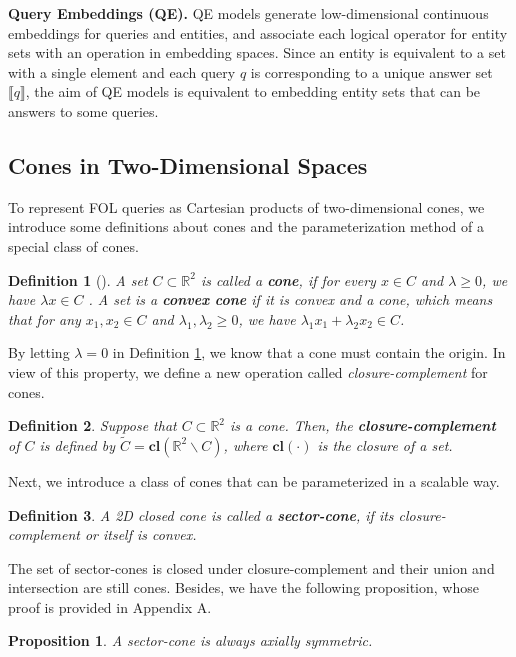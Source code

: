\documentclass{article}
\newcommand{\cl}{\textbf{cl}}
\newtheorem{prop}{Proposition}
\newtheorem{definition}{Definition}
\begin{document}
\textbf{Query Embeddings (QE). } QE models generate low-dimensional continuous embeddings for queries and entities, and associate each logical operator for entity sets with an operation in embedding spaces. 
Since an entity is equivalent to a set with a single element and each query $q$ is corresponding to a unique answer set $\llbracket q\rrbracket$, the aim of QE models is equivalent to embedding entity sets that can be answers to some queries.

\subsection{Cones in Two-Dimensional Spaces}\label{sec:cones}
To represent FOL queries as Cartesian products of two-dimensional cones, we introduce some definitions about cones and the parameterization method of a special class of cones.
\begin{definition}[\citet{boyd}]\label{def:cone}
A set $C\subset\mathbb{R}^2$ is called a \textbf{cone}, if for every $x\in C$ and $\lambda\ge 0$, we have $\lambda x\in C$ . A set is a \textbf{convex cone} if it is convex and a cone, which means that for any $x_1, x_2\in C$ and $\lambda_1, \lambda_2\ge 0$, we have $\lambda_1 x_1+\lambda_2 x_2\in C$.
\end{definition}

By letting $\lambda=0$ in Definition \ref{def:cone}, we know that a cone must contain the origin. In view of this property, we define a new operation called \textit{closure-complement} for cones.
\begin{definition}\label{def:odc}
Suppose that $C\subset\mathbb{R}^2$ is a cone. Then, the \textbf{closure-complement} of $C$ is defined by $\tilde{C}=\cl(\mathbb{R}^2\backslash C)$, where $\cl(\cdot)$ is the closure of a set.
\end{definition}

Next, we introduce a class of cones that can be parameterized in a scalable way.
\begin{definition}\label{def:sec_cone}
A 2D closed cone is called a \textbf{sector-cone}, if its closure-complement or itself is convex.
\end{definition}
The set of sector-cones is closed under closure-complement and their union and intersection are still cones. Besides, we have the following proposition, whose proof is provided in Appendix A.
\begin{prop}\label{prop:axial}
A sector-cone is always axially symmetric.
\end{prop}
\end{document}
